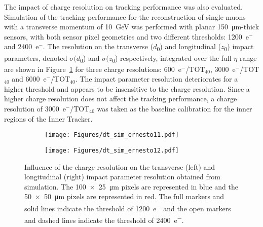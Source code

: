 The impact of charge resolution on tracking performance was also evaluated.
Simulation of the tracking performance for the reconstruction of single muons with a transverse momentum of \SI{10}{\giga\electronvolt} was performed with planar \SI{150}{\micro\meter}-thick sensors, with both sensor pixel geometries and two different thresholds: \num{1200}~e${^{-}}$ and \num{2400}~e${^{-}}$.
The resolution on the transverse ($d$\textsubscript{0}) and longitudinal ($z$\textsubscript{0}) impact parameters, denoted $\sigma(d$\textsubscript{0}) and $\sigma(z$\textsubscript{0}) respectively, integrated over the full $\eta$ range are shown in Figure~\ref{fig:dt-tot-resolution} for three charge resolutions: \num{600}~e${^{-}}$/TOT$_{40}$, \num{3000}~e${^{-}}$/TOT$_{40}$ and \num{6000}~e${^{-}}$/TOT$_{40}$.
The impact parameter resolution deteriorates for a higher threshold and appears to be insensitive to the charge resolution. Since a higher charge resolution does not affect the tracking performance, a charge resolution of \num{3000}~e${^{-}}$/TOT$_{40}$ was taken as the baseline calibration for the inner regions of the Inner Tracker.


\begin{figure}[htb]
    \centering
    \begin{subfigure}{0.49\textwidth}
        \texttt{[image: Figures/dt\_sim\_ernesto11.pdf]}
    \end{subfigure}
    \hfill
    \begin{subfigure}{0.49\textwidth}
        \texttt{[image: Figures/dt\_sim\_ernesto12.pdf]}
    \end{subfigure}  
    \caption{Influence of the charge resolution on the transverse (left) and longitudinal (right) impact parameter resolution obtained from simulation. The \SI[product-units = power]{100x25}{\micro\meter} pixels are represented in blue and the \SI[product-units = power]{50x50}{\micro\meter} pixels are represented in red. The full markers and solid lines indicate the threshold of \SI{1200}{e^-} and the open markers and dashed lines indicate the threshold of \SI{2400}{e^-}.}
    \label{fig:dt-tot-resolution}
\end{figure}